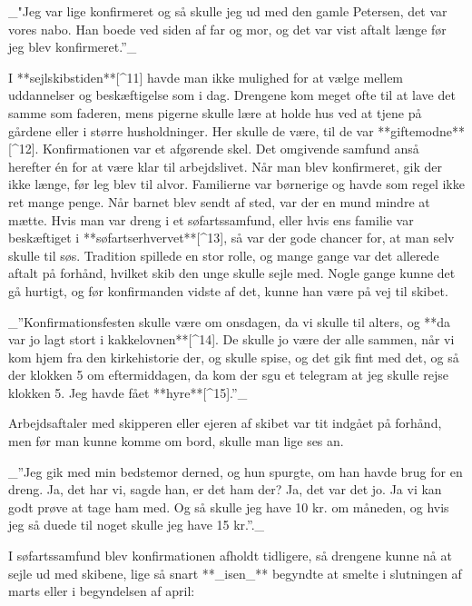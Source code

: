 \documentclass{book}
\begin{document}
 _"Jeg var lige konfirmeret og så skulle jeg ud med den gamle Petersen, det var vores nabo.
 Han boede ved siden af far og mor, og det var vist aftalt længe før jeg blev
 konfirmeret.”_


I **sejlskibstiden**[^11] havde man ikke mulighed for at vælge mellem uddannelser og beskæftigelse
som i dag. Drengene kom meget ofte til at lave det samme som faderen, mens pigerne
skulle lære at holde hus ved at tjene på gårdene eller i større husholdninger. Her
skulle de være, til de var **giftemodne**[^12]. Konfirmationen var et afgørende skel. Det
omgivende samfund anså herefter én for at være klar til arbejdslivet. Når man blev
konfirmeret, gik der ikke længe, før leg blev til alvor. Familierne var børnerige og
havde som regel ikke ret mange penge. Når barnet blev sendt af sted, var der en mund
mindre at mætte. Hvis man var dreng i et søfartssamfund, eller hvis ens familie var
beskæftiget i **søfartserhvervet**[^13], så var der gode chancer for, at man selv skulle til søs.
Tradition spillede en stor rolle, og mange gange var det allerede aftalt på forhånd,
hvilket skib den unge skulle sejle med. Nogle gange kunne det gå hurtigt, og før
konfirmanden vidste af det, kunne han være på vej til skibet.

 _”Konfirmationsfesten skulle være om onsdagen, da vi skulle til alters, og **da var jo lagt
stort i kakkelovnen**[^14]. De skulle jo være der alle sammen, når vi kom hjem fra den
kirkehistorie der, og skulle spise, og det gik fint med det, og så der klokken 5 om
eftermiddagen, da kom der sgu et telegram at jeg skulle rejse klokken 5. Jeg havde fået
**hyre**[^15].”_

Arbejdsaftaler med skipperen eller ejeren af skibet var tit indgået på forhånd, men før
man kunne komme om bord, skulle man lige ses an.

 _”Jeg gik med min bedstemor derned, og hun spurgte, om han havde brug for en dreng. Ja,
det har vi, sagde han, er det ham der? Ja, det var det jo. Ja vi kan godt prøve at tage
ham med. Og så skulle jeg have 10 kr. om måneden, og hvis jeg så duede til noget skulle
jeg have 15 kr.”._

I søfartssamfund blev konfirmationen afholdt tidligere, så drengene kunne nå at sejle ud
med skibene, lige så snart **_isen_** begyndte at smelte i slutningen af marts eller i
begyndelsen af april:

\end{document}
